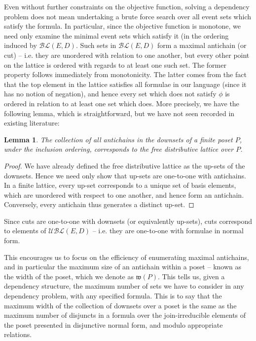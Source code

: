 \documentclass[hoptionsi,review,screen,format=acmsmall]{acmart}
\newtheorem{lemma}[theorem]{Lemma}
\theoremstyle{definition}
\newcommand{\UBLc}{\mathcal{UBL}}
\newcommand{\BLc}{\mathcal{BL}}
\newcommand{\Wf}{\mathfrak{w}}
\begin{document}
Even without further constraints on the objective function, solving a dependency problem does not mean undertaking a brute force search over all event sets which satisfy the formula. In particular, since the objective function is monotone, we need only examine the minimal event sets which satisfy it (in the ordering induced by \(\BLc(E,D)\). Such sets in \(\BLc(E,D)\) form a maximal  antichain (or cut) -- i.e. they are unordered with relation to one another, but every other point on the lattice is ordered with regards to at least one such set. The former property follows immediately from monotonicity. The latter comes from the fact that the top element in the lattice satisfies all formulae in our language (since it has no notion of negation), and hence every set which does not satisfy \(\phi\) is ordered in relation to at least one set which does.  More precisely, we have the following lemma, which is straightforward, but we have not seen recorded in existing literature:

\begin{lemma}
The collection of all antichains in the downsets of a finite poset \(P\), under the inclusion ordering, corresponds to the free distributive lattice over \(P\).
\end{lemma}
\begin{proof}
We have already defined the free distributive lattice as the up-sets of the downsets. Hence we need only show that up-sets are one-to-one with antichains. In a finite lattice, every up-set corresponds to a unique set of basis elements, which are unordered with respect to one another, and hence form an antichain. Conversely, every antichain thus generates a distinct up-set.
\end{proof}

Since cuts are one-to-one with downsets (or equivalently up-sets), cuts correspond to elements of \(\UBLc(E,D)\) -- i.e. they are one-to-one with formulae in normal form.  

This encourages us to focus on the efficiency of enumerating maximal antichains, and in particular the maximum size of an antichain within a poset -- known as the width of the poset, which we denote as \(\Wf(P)\). This tells us, given a dependency structure, the maximum number of sets we have to consider in any dependency problem, with any specified formula. This is to say that the maximum width of the collection of downsets over a poset is the same as the maximum number of disjuncts in a formula over the join-irreducible elements of the poset presented in disjunctive normal form, and modulo appropriate relations.  
\end{document}
